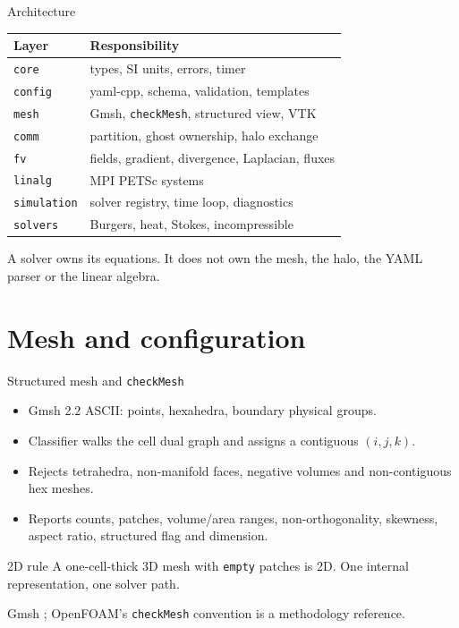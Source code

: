 \documentclass[aspectratio=169,10pt]{beamer}
\begin{document}
\begin{frame}{Architecture}
  \begin{center}
  \small
  \begin{tabular}{ll}
    \toprule
    Layer & Responsibility \\
    \midrule
    \texttt{core} & types, SI units, errors, timer \\
    \texttt{config} & yaml-cpp, schema, validation, templates \\
    \texttt{mesh} & Gmsh, \texttt{checkMesh}, structured view, VTK \\
    \texttt{comm} & partition, ghost ownership, halo exchange \\
    \texttt{fv} & fields, gradient, divergence, Laplacian, fluxes \\
    \texttt{linalg} & MPI PETSc systems \\
    \texttt{simulation} & solver registry, time loop, diagnostics \\
    \texttt{solvers} & Burgers, heat, Stokes, incompressible \\
    \bottomrule
  \end{tabular}
  \end{center}

  \small
  A solver owns its equations. It does not own the mesh, the halo, the YAML
  parser or the linear algebra.
\end{frame}

\section{Mesh and configuration}

\begin{frame}{Structured mesh and \texttt{checkMesh}}
  \begin{itemize}
    \item Gmsh 2.2 ASCII: points, hexahedra, boundary physical groups.
    \item Classifier walks the cell dual graph and assigns a contiguous
          $(i,j,k)$.
    \item Rejects tetrahedra, non-manifold faces, negative volumes and
          non-contiguous hex meshes.
    \item Reports counts, patches, volume/area ranges, non-orthogonality,
          skewness, aspect ratio, structured flag and dimension.
  \end{itemize}

  \begin{block}{2D rule}
    A one-cell-thick 3D mesh with \texttt{empty} patches is 2D. One internal
    representation, one solver path.
  \end{block}

  \small
  Gmsh \cite{geuzaineRemacle2009}; OpenFOAM's \texttt{checkMesh} convention is a
  methodology reference.
\end{frame}
\end{document}
